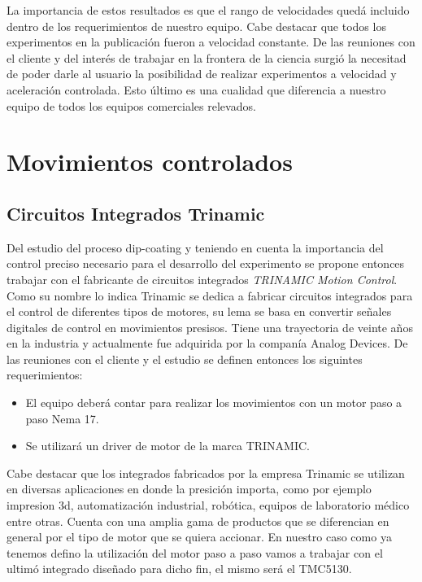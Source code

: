 La importancia de estos resultados es que el rango de velocidades quedá incluido dentro de los requerimientos de nuestro equipo. Cabe destacar que todos los experimentos en la publicación fueron a  velocidad constante. De las reuniones con el cliente y del interés de trabajar en la frontera de la ciencia surgió la necesitad de poder darle al usuario la posibilidad de realizar experimentos a velocidad y aceleración controlada.  Esto último es una cualidad que diferencia a nuestro equipo de todos los equipos comerciales relevados. 
  

\section{Movimientos controlados}
\subsection{Circuitos Integrados Trinamic}

Del estudio del proceso dip-coating y teniendo en cuenta la importancia del control preciso necesario para el desarrollo del experimento se propone entonces trabajar con el fabricante de circuitos integrados \textit{TRINAMIC Motion Control}\citep{3_web_trinamic}. Como su nombre lo indica Trinamic se dedica a fabricar circuitos integrados para el control de diferentes tipos de motores, su lema se basa en convertir señales digitales de control en movimientos presisos. Tiene una trayectoria de veinte años en la industria y actualmente fue adquirida por la companía Analog Devices.
De las reuniones con el cliente y el estudio se definen entonces los siguintes requerimientos:
			
\begin{itemize}
\item El equipo deberá contar para realizar los movimientos con un motor paso a paso Nema 17.
\item Se utilizará un driver de motor de la marca TRINAMIC.
\end{itemize}

Cabe destacar que los integrados fabricados por la empresa Trinamic se utilizan en diversas aplicaciones en donde la presición importa, como por ejemplo impresion 3d, automatización industrial, robótica, equipos de laboratorio médico entre otras.
Cuenta con una amplia gama de productos que se diferencian en general por el tipo de motor que se quiera accionar. En nuestro caso como ya tenemos defino la utilización del motor paso a paso vamos a trabajar con el ultimó integrado diseñado para dicho fin, el mismo será el TMC5130. 
  
